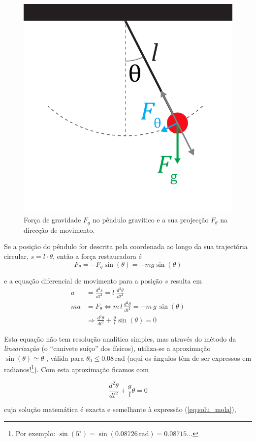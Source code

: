 \documentclass[a4paper,twoside,12pt]{article}      %
\begin{document}
\begin{figure}
	[!htbp] \centering 
	\includegraphics[width=0.4	\textwidth]{Fig-2}
	\caption{Força de gravidade $F_g$ no pêndulo gravítico e a sua projecção $F_{\theta}$ na direcção de movimento. \label{fig:3} } 
\end{figure}

Se a posição do pêndulo for descrita pela coordenada  ao longo da sua trajectória circular, $s= l\cdot \theta$,
então a força restauradora é 
\begin{equation}
	\label{eq:4} 
F_{\theta} = - F_{g} \sin(\theta) = - mg \sin(\theta)
\end{equation}

e a equação diferencial de movimento para a posição $s$ resulta em
\begin{align}
	\label{eq:5} 
	a &= \frac{d^2 s}{dt^2} =  l\;  \frac{d^2 \theta}{dt^2} \nonumber \\
	ma &= F_{\theta}\Leftrightarrow m \, l \, \frac{d^2 \theta}{dt^2} = - m \,  g \, \sin(\theta) \nonumber \\
	 & \Rightarrow \frac{d^2 \theta}{dt^2} + \frac{g}{l} \sin(\theta) = 0
\end{align}

Esta equação não tem  resolução analítica simples, mas através do método  da \emph{linearização} (o ``canivete suíço'' dos físicos),  utiliza-se a aproximação $ \sin(\theta) \simeq \theta$ , válida para  $\theta_0 \le 0.08\,\mathrm{rad}$ (aqui  os ângulos têm de ser expressos em radianos!\footnote{ Por exemplo: $\sin(5 ^{\circ}) = \sin(0.08726 \, \mathrm{rad}) = 0.08715... $}).
Com esta aproximação ficamos com 

\begin{equation}
	\label{eq:6} 
	 \frac{d^2 \theta}{dt^2} + \frac{g}{l} \theta =0
\end{equation}

cuja solução matemática é exacta e semelhante à expressão (\ref{eq:solu_mola}),
\end{document}
